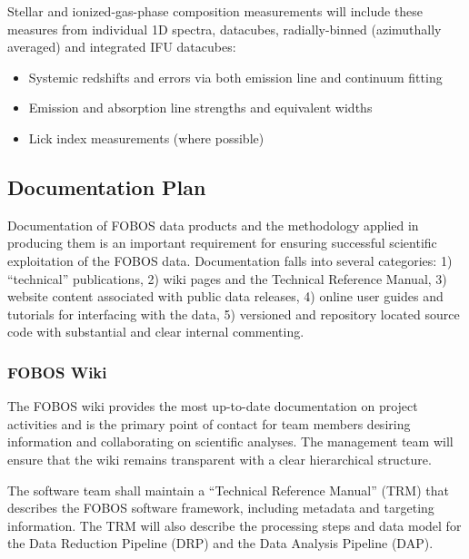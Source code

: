 \documentclass[preprint,11pt]{aastex}
\begin{document}
\medskip
\noindent Stellar and ionized-gas-phase composition measurements will include
these measures from individual 1D spectra, datacubes,
radially-binned (azimuthally averaged) and integrated IFU datacubes:

\begin{itemize}
  \item Systemic redshifts and errors via both emission line and continuum fitting
  \item Emission and absorption line strengths and equivalent widths
  \item Lick index measurements (where possible)
\end{itemize}




\subsection{Documentation Plan} \label{sec:documentation}


Documentation of FOBOS data products and the methodology applied in producing them is an important requirement for
ensuring successful scientific exploitation of the FOBOS data.  Documentation falls into several categories: 1) ``technical''
publications, 2) wiki pages and the Technical Reference Manual, 3) website content associated with public data
releases, 4) online user guides and tutorials for interfacing with the data, 5) versioned and repository located source
code with substantial and clear internal commenting.  

\subsubsection{FOBOS Wiki}

The FOBOS wiki provides the most up-to-date documentation on project activities and is the primary point of contact for
team members desiring information and collaborating on scientific analyses.  The management team will ensure that the
wiki remains transparent with a clear hierarchical structure.  

The software team shall maintain a ``Technical Reference Manual'' (TRM) that describes the FOBOS software framework, including metadata
and targeting information.  The TRM will also describe the processing
steps and data model for the Data Reduction Pipeline (DRP) and the Data
Analysis Pipeline (DAP).  
\end{document}
